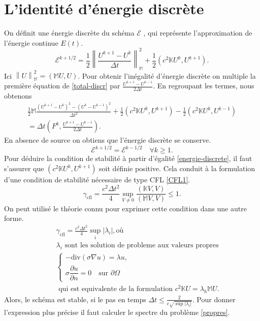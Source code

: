 \documentclass[12pt]{article}
\newcommand\norm[1]{\left\lVert#1\right\rVert}
\newcommand{\pd}[2]{ %
	\dfrac{\partial #1}{\partial #2}
}
\begin{document}
\section{L'identité d'énergie discrète}
On définit une énergie discrète du schéma $\mathcal{E}$ , qui représente l'approximation de l'énergie continue $E(t)$.
\begin{equation}
	\mathcal{E}^{k + 1/2} = \frac{1}{2}\norm{\frac{U^{k+1} - U^k}{\Delta t}}_\mathbb{M}^2 + \frac{1}{2}(c^2\mathbb{K}U^k, U^{k+1}).
\end{equation}
Ici $\norm{U}_\mathbb{M}^2 = (\mathbb{M}U,U)$. Pour obtenir l'inégalité d'énergie discrète on multiple la première équation de \eqref{total-discr} par $\frac{U^{k+1} - U^{k - 1}}{2\Delta t}$. En regroupant les termes, nous obtenons
\begin{multline}
	\frac{1}{2}\mathbb{M}\frac{(U^{k+1} - U^k)^2 - (U^k - U^{k-1})^2}{\Delta t^2} + \frac{1}{2}(c^2\mathbb{K}U^k, U^{k+1}) - \frac{1}{2}(c^2\mathbb{K}U^{k}, U^{k-1}) \\= \Delta t(F^k, \frac{U^{k+1} - U^{k - 1}}{2\Delta t}).
\end{multline}
En absence de source on obtiens que l'énergie discrète se conserve.
\begin{equation}
\label{energie-discrete}
	\mathcal{E}^{k +1/2} = \mathcal{E}^{k - 1/2} \quad \forall k \geq 1.
\end{equation}
Pour déduire la condition de stabilité à partir d'égalité \eqref{energie-discrete}, il faut s'assurer que $(c^2\mathbb{K}U^k, U^{k+1})$ soit définie positive. Cela conduit à la formulation d'une condition de stabilité nécessaire de type CFL \eqref{CFL1}.
\begin{equation}
\label{CFL1}
\gamma_{\text{cfl}} = \frac{c^2 \Delta t^2}{4}\sup_{V \neq 0} \frac{(\mathbb{K}V, V)}{(\mathbb{M}V, V)} \leq 1.
\end{equation}
On peut utilisé le théorie connu pour exprimer cette condition dans une autre forme.
\begin{eqnarray}
	& &\gamma_{\text{cfl}} = \frac{c^2 \Delta t^2}{4} \sup_i|\lambda_i|, \text{où}\\
	\nonumber
	& &\lambda_i \text{ sont les solution de probleme aux valeurs propres}\\
	\label{propres}
	& &\begin{cases}
	-\text{div}(\sigma\nabla u ) = \lambda u,\\
	\sigma \pd{u}{n} = 0 \quad \text{sur } \partial\Omega
	\end{cases} \\
		\nonumber
	& &\text{ qui est equivalente de la formulation } c^2\mathbb{K}U = \lambda_h \mathbb{M}U.
\end{eqnarray}
Alors, le schéma est stable, si le pas en temps $\Delta t \leq \frac{2}{c \sqrt{\sup |\lambda_i|}}$. Pour donner l'expression plus précise il faut calculer le spectre du problème \eqref{propres}.
\end{document}
